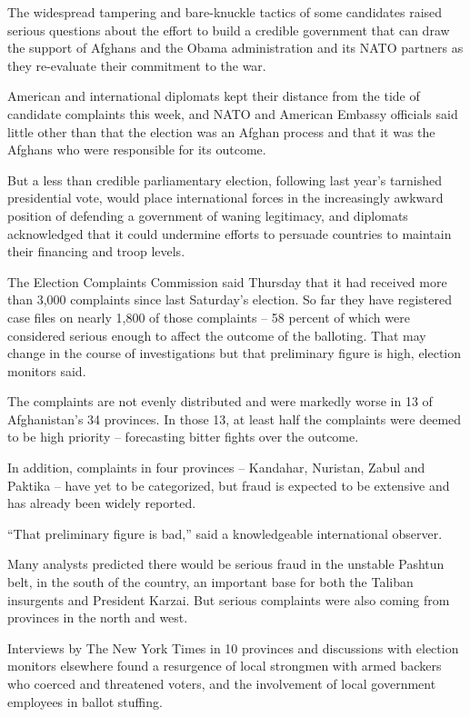 ﻿\documentclass[12pt]{article}
\begin{document}
The widespread tampering and bare-knuckle tactics of some candidates raised serious questions about
the effort to build a credible government that can draw the support of Afghans and the Obama
administration and its NATO partners as they re-evaluate their commitment to the war.

American and international diplomats kept their distance from the tide of candidate complaints this
week, and NATO and American Embassy officials said little other than that the election was an Afghan
process and that it was the Afghans who were responsible for its outcome.

But a less than credible parliamentary election, following last year's tarnished presidential vote,
would place international forces in the increasingly awkward position of defending a government of
waning legitimacy, and diplomats acknowledged that it could undermine efforts to persuade countries
to maintain their financing and troop levels.

The Election Complaints Commission said Thursday that it had received more than 3,000 complaints
since last Saturday's election. So far they have registered case files on nearly 1,800 of those
complaints -- 58 percent of which were considered serious enough to affect the outcome of the
balloting. That may change in the course of investigations but that preliminary figure is high,
election monitors said.

The complaints are not evenly distributed and were markedly worse in 13 of Afghanistan's 34
provinces. In those 13, at least half the complaints were deemed to be high priority -- forecasting
bitter fights over the outcome.

In addition, complaints in four provinces -- Kandahar, Nuristan, Zabul and Paktika -- have yet to be
categorized, but fraud is expected to be extensive and has already been widely reported.

``That preliminary figure is bad,'' said a knowledgeable international observer.

Many analysts predicted there would be serious fraud in the unstable Pashtun belt, in the south of
the country, an important base for both the Taliban insurgents and President Karzai. But serious
complaints were also coming from provinces in the north and west.

Interviews by The New York Times in 10 provinces and discussions with election monitors elsewhere
found a resurgence of local strongmen with armed backers who coerced and threatened voters, and the
involvement of local government employees in ballot stuffing.
\end{document}

